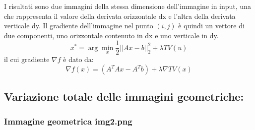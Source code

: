 I risultati sono due immagini della stessa dimensione dell'immagine in input, una che rappresenta il valore della derivata orizzontale dx e l'altra della derivata verticale dy. Il gradiente dell'immagine nel punto $(i, j)$ è quindi un vettore di due componenti, uno orizzontale contenuto in dx e uno verticale in dy.
\[x^* = \arg\min_x \frac{1}{2} ||Ax - b||_2^2 + \lambda TV(u)\] 
il cui gradiente $\nabla f$ è dato da: 
\[\nabla f(x) = (A^TAx - A^Tb)  + \lambda \nabla TV(x)\]
\newpage
{\color{rred}\subsection{Variazione totale delle immagini geometriche:}}
{\color{rred}\subsubsection{Immagine geometrica img2.png}}
